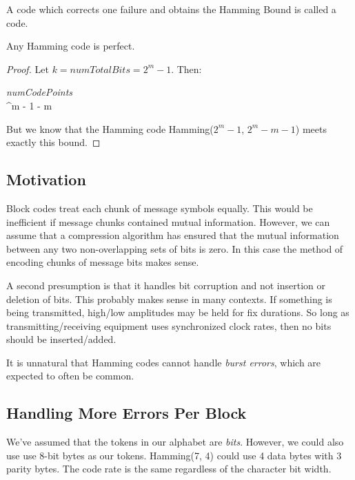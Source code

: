 \documentclass[11pt, oneside]{amsart}
\begin{document}
\begin{definition}
  A code which corrects one failure and obtains the Hamming Bound is
  called a  code.
\end{definition}

\begin{corollary}
  Any Hamming code is perfect.
\end{corollary}

\begin{proof}
  Let $k = \textit{numTotalBits} = 2^m - 1$. Then:

  \begin{nedqn}
    \textit{numCodePoints}
  \leqcol
  \\
  ^m - 1 - m
  \end{nedqn}

  But we know that the Hamming code Hamming($2^m - 1$, $2^m - m - 1$)
  meets exactly this bound.
\end{proof}

\subsection{Motivation}

Block codes treat each chunk of message symbols equally. This would be
inefficient if message chunks contained mutual information. However, we
can assume that a compression algorithm has ensured that the mutual
information between any two non-overlapping sets of bits is zero. In
this case the method of encoding chunks of message bits makes sense.

A second presumption is that it handles bit corruption and not insertion
or deletion of bits. This probably makes sense in many contexts. If
something is being transmitted, high/low amplitudes may be held for fix
durations. So long as transmitting/receiving equipment uses synchronized
clock rates, then no bits should be inserted/added.

It is unnatural that Hamming codes cannot handle \emph{burst errors},
which are expected to often be common.

\subsection{Handling More Errors Per Block}

We've assumed that the tokens in our alphabet are \emph{bits}. However,
we could also use use 8-bit bytes as our tokens. Hamming(7, 4) could use
4 data bytes with 3 parity bytes. The code rate is the same regardless
of the character bit width.
\end{document}
